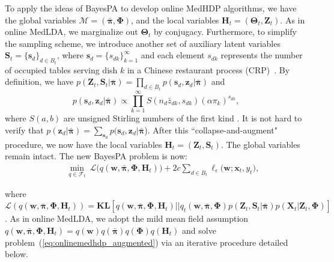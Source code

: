\documentclass[twoside,11pt]{article}
\newcommand{\xv}{\bm{x}}
\newcommand{\Xv}{\bm{X}}
\newcommand{\Yv}{\bm{Y}}
\newcommand{\zv}{\bm{z}}
\newcommand{\Zv}{\bm{Z}}
\newcommand{\sv}{\bm{s}}
\newcommand{\Sv}{\bm{S}}
\newcommand{\Hv}{\bm{H}}
\newcommand{\wv}{\bm{w}}
\newcommand{\eat}[1]{}
\newcommand{\Thetav}{\bm{\Theta}}
\newcommand{\Phiv}{\bm{\Phi}}
\newcommand{\lambdav}{\bm \lambda}
\newcommand{\barpiv}{\bm{\bar{\pi}}}
\newcommand{\Mv}{\bm{\mathcal{M}}}
\newcommand{\ep}{\mathbb{E}}
\newcommand{\KL}{\textbf{KL}}
\begin{document}
To apply the ideas of BayesPA to develop online MedHDP algorithms, we have the global variables $\Mv = (\barpiv, \Phiv)$, and the local variables $\Hv_t = (\Thetav_t, \Zv_t)$. As in online MedLDA, we marginalize out $\Thetav_t$ by conjugacy. Furthermore, to simplify the sampling scheme, we introduce another set of auxiliary latent variables $\Sv_t = \{\sv_d\}_{d \in B_t}$, where $\sv_d = \{s_{dk} \}_{k=1}^\infty$ and each element $s_{dk}$ represents the number of occupied tables serving dish $k$ in a Chinese restaurant process (CRP)~\citep{teh2006hierarchical, wang2012truncation}. By definition, we have $p(\Zv_t, \Sv_t | \barpiv) =  \prod_{d \in B_t} p(\sv_d, \zv_d | \barpiv)$  and
%
\begin{equation} \label{eq:joint_zs}
p(\sv_d, \zv_d | \barpiv) \propto  \prod_{k = 1}^{\infty}{S( n_d \bar{z}_{dk}, s_{dk}) (\alpha \pi_k)^{s_{dk}}},
\end{equation}
%
where  $S(a,b)$ are unsigned Stirling numbers of the first kind \citep{antoniak1974mixtures}. It is not hard to verify that $p(\zv_d | \barpiv) = \sum_{\sv_d}{p(\sv_d, \zv_d | \barpiv}$). After this ``collapse-and-augment" procedure, we now have the local variables $\Hv_t = (\Zv_t, \Sv_t)$. The global variables remain intact. The new BayesPA problem is now:
\begin{eqnarray} \label{eq:onlinemedhdp_augmented}
&& \underset{q \in \mathcal{F}_t}{\operatorname{min}}{~\mathcal{L}\Big( q(\wv, \barpiv, \Phiv, \Hv_t) \Big) + 2c \sum\limits_{d \in B_t}\ell_\epsilon \Big(\wv; \xv_t, y_t \Big)},
\end{eqnarray}
\eat{\setlength\arraycolsep{-4pt}  \begin{eqnarray} \label{eq:onlinemedhdp_augmented}
&& \underset{q \in \mathcal{F}_t}{\operatorname{min}}{~\mathcal{L}(q(\wv, \barpiv, \Phiv, \Hv_t)\!)
\!-\!\ep_q[\log \psi(\Yv_t, \lambdav_t | \Zv_t, \wv)]},
\end{eqnarray}}
%
%
where $\mathcal{L}(q(\wv, \barpiv, \Phiv, \Hv_t)) = \KL[q(\wv, \barpiv, \Phiv, \Hv_t) || q_t(\wv, \barpiv, \Phiv) p(\Zv_t, \Sv_t | \barpiv) p(\Xv_t | \Zv_t, \Phiv)]$ . As in online MedLDA, we adopt the mild mean field assumption $q(\wv, \barpiv, \Phiv, \Hv_t) = q(\wv) q(\barpiv) q(\Phiv) q(\Hv_t)$ and solve problem~(\ref{eq:onlinemedhdp_augmented}) via an iterative procedure detailed below.
\end{document}
